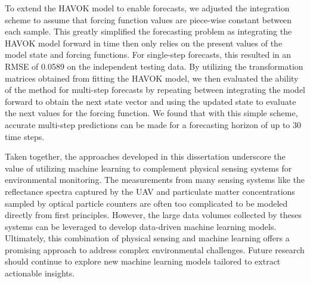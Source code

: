 To extend the HAVOK model to enable forecasts, we adjusted the
integration scheme to assume that forcing function values are piece-wise
constant between each sample. This greatly simplified the forecasting problem as
integrating the HAVOK model forward in time then only relies on the present
values of the model state and forcing functions. For single-step forecasts,
this resulted in an RMSE of 0.0589 on the independent testing data. By utilizing
the transformation matrices obtained from fitting the HAVOK model, we then
evaluated the ability of the method for multi-step forecasts by repeating between
integrating the model forward to obtain the next state vector and using the
updated state to evaluate the next values for the forcing function. We found
that with this simple scheme, accurate multi-step predictions can be made for a
forecasting horizon of up to 30 time steps.

Taken together, the approaches developed in this dissertation underscore the
value of utilizing machine learning to complement physical sensing systems
for environmental monitoring. The measurements from many sensing systems like the
reflectance spectra captured by the UAV and particulate matter concentrations
sampled by optical particle counters are often too complicated to be modeled
directly from first principles. However, the large data volumes collected by
theses systems can be leveraged to develop data-driven machine learning models.
Ultimately, this combination of physical sensing and machine learning offers a
promising approach to address complex environmental challenges. Future research
should continue to explore new machine learning models tailored to extract
actionable insights.



